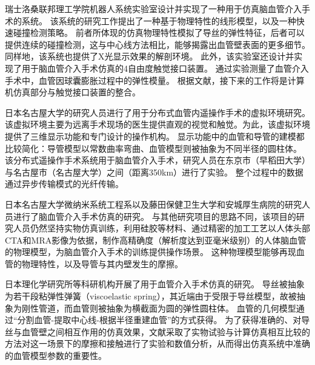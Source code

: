 瑞士洛桑联邦理工学院机器人系统实验室设计并实现了一种用于仿真脑血管介入手术的系统\cite{Wang2007EPFL}\cite{Ilic2005EPFL}\cite{Moix2005EPFL}\cite{Ilic2005aEPFL}\cite{Ilic2005bEPFL}。
该系统的研究工作提出了一种基于物理特性的线形模型，以及一种快速碰撞检测策略\cite{Wang2007EPFL}。
前者所体现的仿真物理特性模拟了导丝的弹性特征，后者可以提供连续的碰撞检测，这与中心线方法相比，能够揭露出血管壁表面的更多细节。
同样地，该系统也提供了X光显示效果的解剖环境。
此外，该实验室还设计并实现了用于脑血管介入手术仿真的4自由度触觉接口装置\cite{Ilic2005EPFL}\cite{Moix2005EPFL}\cite{Ilic2005aEPFL}。
通过实验测量了血管介入手术中，血管因球囊膨胀过程中的弹性模量\cite{Ilic2005bEPFL}。
根据文献\cite{Wang2007EPFL}，接下来的工作将是计算机仿真部分与触觉接口装置的整合。

日本名古屋大学的研究人员进行了用于分布式血管内遥操作手术的虚拟环境研究\cite{Arai1994Nagoya}\cite{Arai1995Nagoya}\cite{Arai1996Nagoya}。
该虚拟环境主要为远离手术现场的医生提供直观的视觉和触觉。为此，该虚拟环境提供了三维显示功能和专门设计的操作机构。
显示功能中的血管和导管的建模都比较简化：导管模型以常数曲率弯曲、血管模型则被抽象为不同半径的圆柱体\cite{Arai1994Nagoya}\cite{Arai1995Nagoya}。
该分布式遥操作手术系统用于脑血管介入手术，研究人员在东京市（早稻田大学）与名古屋市（名古屋大学）之间（距离350km）进行了实验。
整个过程中的数据通过异步传输模式的光纤传输\cite{Arai1996Nagoya}。

日本名古屋大学微纳米系统工程系以及藤田保健卫生大学和安城厚生病院的研究人员进行了脑血管介入手术仿真的研究\cite{Ikeda2004Nagoya}\cite{Ikeda2005Nagoya}\cite{Ikeda2005aNagoya}\cite{Ikeda2006Nagoya}\cite{Ikeda2007Nagoya}。
与其他研究项目的思路不同，该项目的研究人员仍然坚持实物仿真训练，利用硅胶等材料、通过精密的加工工艺以人体头部CTA和MRA影像为依据，制作高精确度（解析度达到亚毫米级别）的人体脑血管的物理模型，为脑血管介入手术的训练提供操作场景\cite{Ikeda2005Nagoya}。
这种物理模型能够再现血管的物理特性，以及导管与其内壁发生的摩擦。

日本理化学研究所等科研机构开展了用于血管介入手术仿真的研究\cite{takashima2009RIKEN}\cite{takashima2007RIKEN}。
导丝被抽象为若干段粘弹性弹簧（viscoelastic spring），其近端由于受限于导丝模型，故被抽象为刚性管道，而血管则被抽象为横截面为圆的弹性圆柱体\cite{takashima2009RIKEN}。
血管的几何模型通过“分割血管-提取中心线-根据半径重建血管”的方式获得\cite{takashima2009RIKEN}。
为了获得准确的、对导丝与血管壁之间相互作用的仿真效果，文献\cite{takashima2007RIKEN}采取了实物试验与计算仿真相互比较的方法对这一场景下的摩擦和接触进行了实验和数值分析，从而得出仿真系统中准确的血管模型参数的重要性。

